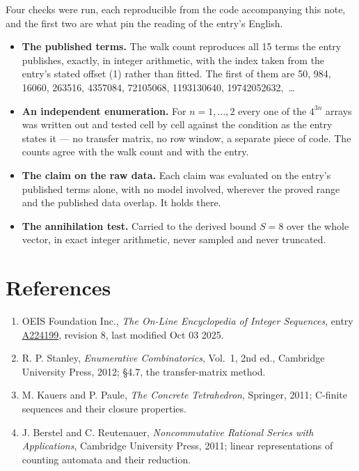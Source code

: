 \documentclass[11pt]{article}
\theoremstyle{definition}
\begin{document}
Four checks were run, each reproducible from the code accompanying this note, and the first two are what pin the reading of the entry's English.

\begin{itemize}

\item {\bfseries The published terms.} The walk count reproduces all 15 terms the entry publishes, exactly, in integer arithmetic, with the index taken from the entry's stated offset (1) rather than fitted. The first of them are 50, 984, 16060, 263516, 4357084, 72105068, 1193130640, 19742052632,~\dots

\item {\bfseries An independent enumeration.} For $n = 1,\dots,2$ every one of the $4^{3n}$ arrays was written out and tested cell by cell against the condition as the entry states it --- no transfer matrix, no row window, a separate piece of code. The counts agree with the walk count and with the entry.

\item {\bfseries The claim on the raw data.} Each claim was evaluated on the entry's published terms alone, with no model involved, wherever the proved range and the published data overlap. It holds there.

\item {\bfseries The annihilation test.} Carried to the derived bound $S = 8$ over the whole vector, in exact integer arithmetic, never sampled and never truncated.

\end{itemize}

\section{References}

\begin{enumerate}

\item OEIS Foundation Inc., \emph{The On-Line Encyclopedia of Integer Sequences}, entry \href{https://oeis.org/A224199}{A224199}, revision 8, last modified Oct 03 2025.

\item R. P. Stanley, \emph{Enumerative Combinatorics}, Vol.~1, 2nd ed., Cambridge University Press, 2012; \S4.7, the transfer-matrix method.

\item M. Kauers and P. Paule, \emph{The Concrete Tetrahedron}, Springer, 2011; C-finite sequences and their closure properties.

\item J. Berstel and C. Reutenauer, \emph{Noncommutative Rational Series with Applications}, Cambridge University Press, 2011; linear representations of counting automata and their reduction.

\end{enumerate}
\end{document}
